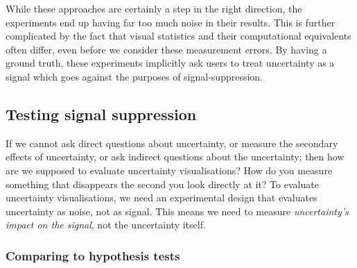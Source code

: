 \documentclass[
  12pt]{article}
\begin{document}
While these approaches are certainly a step in the right direction, the
experiments end up having far too much noise in their results. This is
further complicated by the fact that visual statistics and their
computational equivalents often differ, even before we consider these
measurement errors. By having a ground truth, these experiments
implicitly ask users to treat uncertainty as a signal which goes against
the purposes of signal-suppression.

\subsection{Testing signal
suppression}\label{testing-signal-suppression}

If we cannot ask direct questions about uncertainty, or measure the
secondary effects of uncertainty, or ask indirect questions about the
uncertainty; then how are we supposed to evaluate uncertainty
visualisations? How do you measure something that disappears the second
you look directly at it? To evaluate uncertainty visualisations, we need
an experimental design that evaluates uncertainty as noise, not as
signal. This means we need to measure \emph{uncertainty's impact on the
signal}, not the uncertainty itself.

\subsubsection{Comparing to hypothesis
tests}\label{comparing-to-hypothesis-tests}
\end{document}
